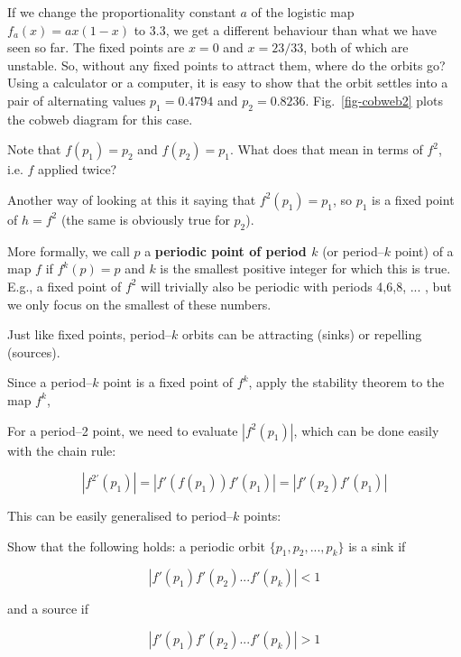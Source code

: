 If we change the proportionality constant $a$ of the logistic map $f_a(x)=ax(1-x)$ to 3.3, we get a different behaviour than what we have seen so far. The fixed points are $x=0$ and $x=23/33$, both of which are unstable. So, without any fixed points to attract them, where do the orbits go? Using a calculator or a computer, it is easy to show that the orbit settles into a pair of alternating values $p_1=0.4794$ and $p_2=0.8236$. Fig.~\ref{fig-cobweb2} plots the cobweb diagram for this case.

\begin{cue}
Note that $f(p_1)=p_2$ and $f(p_2)=p_1$. What does that mean in terms of $f^2$, i.e. $f$ applied twice?
\end{cue}

Another way of looking at this it saying that $f^2(p_1)=p_1$, so $p_1$ is a fixed point of $h=f^2$ (the same is obviously true for $p_2$).

More formally, we call $p$ a \textbf{periodic point of period $k$} (or period--$k$ point) of a map $f$ if $f^k(p)=p$ and $k$ is the smallest positive integer for which this is true. E.g., a fixed point of $f^2$ will trivially also be periodic with periods 4,6,8, ... , but we only focus on the smallest of these numbers.

Just like fixed points, period--$k$ orbits can be attracting (sinks) or repelling (sources).

\begin{cue}
Since a period--$k$ point is a fixed point of $f^k$, apply the stability theorem to the map $f^k$,
\end{cue}

For a period--2 point, we need to evaluate $|f^2(p_1)|$, which can be done easily with the chain rule:

\begin{equation}
|f^{2'}(p_1)| = |f'(f(p_1)) f'(p_1)| = |f'(p_2) f'(p_1)|
\end{equation}  

This can be easily generalised to period--$k$ points:

\begin{exer}
Show that the following holds: a periodic orbit $\{p_1, p_2, ..., p_k\}$ is a sink if

$$|f'(p_1) f'(p_2) ... f'(p_k)| < 1$$

and a source if

$$|f'(p_1) f'(p_2) ... f'(p_k)| > 1$$

\end{exer}


